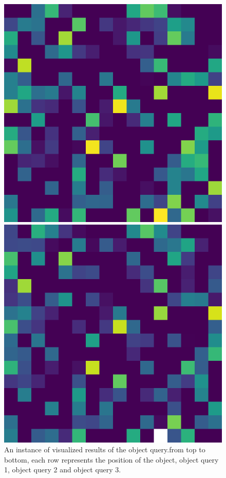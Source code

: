 \begin{figure}[h!]
{	\begin{minipage}[t]{3.5cm}
	\centering
	\includegraphics[width=0.9\linewidth]{figures/result/street/q2_3}
	\end{minipage}
	\begin{minipage}[t]{3.5cm}
	\centering
	\includegraphics[width=0.9\linewidth]{figures/result/street/q2_4}
	\end{minipage}}

	\caption[An instance of Visualized results of the object query]{An instance of visualized results of the object query.from top to bottom, each row represents the position of the object, object query 1, object query 2 and object query 3.}
	\label{fig:tennis}
\end{figure}

